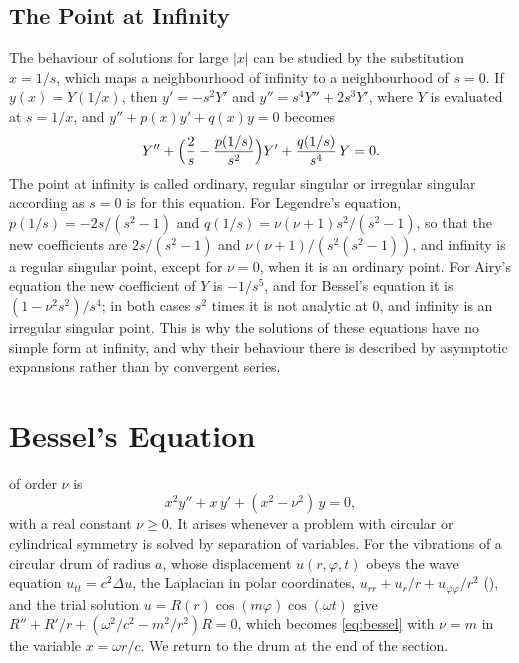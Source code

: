 \subsection{The Point at Infinity}

The behaviour of solutions for large $|x|$ can be studied by the substitution $x=1/s$, which maps a neighbourhood of infinity to a neighbourhood of $s=0$. If $y(x)=Y(1/x)$, then $y'=-s^2Y'$ and $y''=s^4Y''+2s^3Y'$, where $Y$ is evaluated at $s=1/x$, and $y''+p(x)y'+q(x)y=0$ becomes
\[
Y''+\Bigl(\frac2s-\frac{p(1/s)}{s^2}\Bigr)Y'+\frac{q(1/s)}{s^4}\,Y=0 .
\]
The point at infinity is called ordinary, regular singular or irregular singular according as $s=0$ is for this equation. For Legendre's equation, $p(1/s)=-2s/(s^2-1)$ and $q(1/s)=\nu(\nu+1)s^2/(s^2-1)$, so that the new coefficients are $2s/(s^2-1)$ and $\nu(\nu+1)/(s^2(s^2-1))$, and infinity is a regular singular point, except for $\nu=0$, when it is an ordinary point. For Airy's equation the new coefficient of $Y$ is $-1/s^5$, and for Bessel's equation it is $(1-\nu^2s^2)/s^4$; in both cases $s^2$ times it is not analytic at $0$, and infinity is an irregular singular point. This is why the solutions of these equations have no simple form at infinity, and why their behaviour there is described by asymptotic expansions rather than by convergent series.

\section{Bessel's Equation}
\label{sec:bessel}

 of order $\nu$ is
\begin{equation}
x^2y''+x\,y'+(x^2-\nu^2)\,y=0 ,
\label{eq:bessel}
\end{equation}
with a real constant $\nu\ge0$. It arises whenever a problem with circular or cylindrical symmetry is solved by separation of variables. For the vibrations of a circular drum of radius $a$, whose displacement $u(r,\varphi,t)$ obeys the wave equation $u_{tt}=c^2\Delta u$, the Laplacian in polar coordinates, $u_{rr}+u_r/r+u_{\varphi\varphi}/r^2$ (), and the trial solution $u=R(r)\cos(m\varphi)\cos(\omega t)$ give $R''+R'/r+(\omega^2/c^2-m^2/r^2)R=0$, which becomes \eqref{eq:bessel} with $\nu=m$ in the variable $x=\omega r/c$. We return to the drum at the end of the section.

